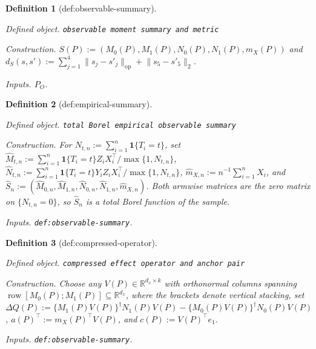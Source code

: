 \documentclass{article}
\newtheorem{definition}{Definition}
\begin{document}
\begin{definition}[def:observable-summary]\label{def:observable-summary}
\par\smallskip\noindent\emph{Defined object.} \texttt{observable moment summary and metric}
\par\smallskip\noindent\emph{Construction.} \(S(P):=(M_0(P),M_1(P),N_0(P),N_1(P),m_X(P))\) and \(d_S(s,s'):=\sum_{j=1}^{4}\lVert s_j-s'_j\rVert_{\mathrm{op}}+\lVert s_5-s'_5\rVert_2\).
\par\smallskip\noindent\emph{Inputs.} \(P_O\).
\end{definition}

\begin{definition}[def:empirical-summary]\label{def:empirical-summary}
\par\smallskip\noindent\emph{Defined object.} \texttt{total Borel empirical observable summary}
\par\smallskip\noindent\emph{Construction.} For \(N_{t,n}:=\sum_{i=1}^{n}\mathbf 1\{T_i=t\}\), set \(\widehat M_{t,n}:=\sum_{i=1}^{n}\mathbf 1\{T_i=t\}Z_iX_i^\top/\max\{1,N_{t,n}\}\), \(\widehat N_{t,n}:=\sum_{i=1}^{n}\mathbf 1\{T_i=t\}Y_iZ_iX_i^\top/\max\{1,N_{t,n}\}\), \(\widehat m_{X,n}:=n^{-1}\sum_{i=1}^{n}X_i\), and \(\widehat S_n:=(\widehat M_{0,n},\widehat M_{1,n},\widehat N_{0,n},\widehat N_{1,n},\widehat m_{X,n})\). Both armwise matrices are the zero matrix on \(\{N_{t,n}=0\}\), so \(\widehat S_n\) is a total Borel function of the sample.
\par\smallskip\noindent\emph{Inputs.} \texttt{def:\allowbreak{}observable-\allowbreak{}summary}.
\end{definition}

\begin{definition}[def:compressed-operator]\label{def:compressed-operator}
\par\smallskip\noindent\emph{Defined object.} \texttt{compressed effect operator and anchor pair}
\par\smallskip\noindent\emph{Construction.} Choose any \(V(P)\in\mathbb R^{d_x\times k}\) with orthonormal columns spanning \(\operatorname{row}[M_0(P);M_1(P)]\subseteq\mathbb R^{d_x}\), where the brackets denote vertical stacking, set \(\Delta Q(P):=\{M_1(P)V(P)\}^{\dagger}N_1(P)V(P)-\{M_0(P)V(P)\}^{\dagger}N_0(P)V(P)\), \(a(P)^\top:=m_X(P)^\top V(P)\), and \(c(P):=V(P)^\top e_1\).
\par\smallskip\noindent\emph{Inputs.} \texttt{def:\allowbreak{}observable-\allowbreak{}summary}.
\end{definition}
\end{document}
